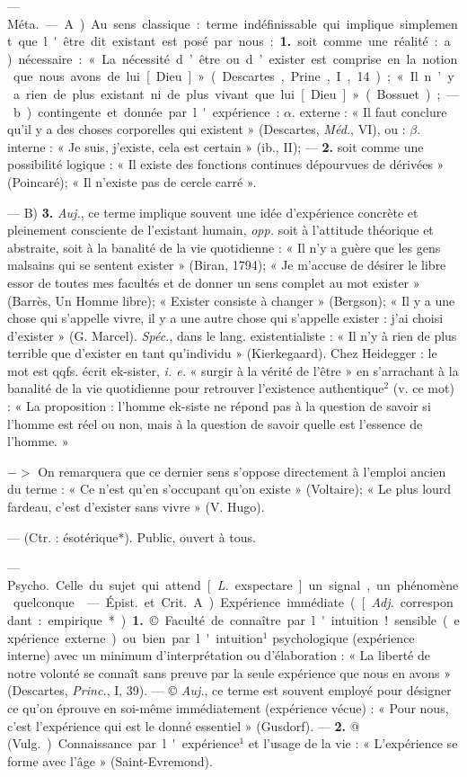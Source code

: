 \begin{itemize}[leftmargin=1cm, label=, itemsep=1pt]
 — \si{Méta.} — A) Au sens classique : terme indéfinissable qui implique simplement que l'être dit
existant est posé par nous : {\bf 1.} soit
comme une réalité : a) nécessaire :
« La nécessité d’être ou d’exister est
comprise en la notion que nous
avons de lui [Dieu] » (Descartes,
Prine., I, 14); « Il n’y a rien de plus
existant ni de plus vivant que lui
[Dieu] » (Bossuet); — b) contingente
et donnée par l'expérience : $\alpha$. externe : « Il faut conclure qu'il y a
des choses corporelles qui existent »
(Descartes, \si{{\it Méd.}}, VI), ou : $\beta$. interne : « Je suis, j'existe, cela est
certain » (ib., II); — {\bf 2.} soit comme
une possibilité logique : « Il existe
des fonctions continues dépourvues
de dérivées » (Poincaré); « Il n'existe
pas de cercle carré ».

— B) {\bf 3.} {\it Auj.}, ce terme implique
souvent une idée d’expérience concrète et pleinement consciente de
l'existant humain, {\it opp.} soit à l’attitude théorique et abstraite, soit à
la banalité de la vie quotidienne :
« Il n’y a guère que les gens malsains
qui se sentent exister » (Biran,
1794); « Je m’accuse de désirer le
libre essor de toutes mes facultés et
de donner un sens complet au mot
exister » (Barrès, Un Homme libre);
« Exister consiste à changer »
(Bergson); « Il y a une chose qui
s'appelle vivre, il y a une autre chose
qui s'appelle exister : j'ai choisi
d'exister » (G. Marcel). {\it Spéc.}, dans
le lang. existentialiste : « Il n'y à
rien de plus terrible que d’exister
en tant qu'individu » (Kierkegaard).
Chez Heidegger : le mot est qqfs.
écrit ek-sister, {\it i. e.} « surgir à la vérité
de l'être » en s’arrachant à la banalité de la vie quotidienne pour
retrouver l'existence authentique$^2$ (v.
ce mot) : « La proposition : l’homme
ek-siste ne répond pas à la question
de savoir si l'homme est réel ou non,
mais à la question de savoir quelle
est l’essence de l’homme. »

$->$ On remarquera que ce dernier sens s'oppose directement à
l'emploi ancien du terme : « Ce n’est
qu'en s'occupant qu'on existe »
(Voltaire); « Le plus lourd fardeau,
c’est d'exister sans vivre » (V. Hugo).

 — (Ctr. : ésotérique*).
Public, ouvert à tous.

 — \si{Psycho.}
Celle du sujet qui attend [{\it L.} exspectare] un signal, un phénomène quelconque.

 — \si{Épist.} et \si{Crit.} A) Expérience immédiate. ([{\it Adj.} correspondant : empirique*). {\bf 1.} © Faculté
de connaître par l'intuition! sensible (expérience externe) ou bien
par l'intuition$^1$ psychologique (expérience interne) avec un minimum
d'interprétation ou d'élaboration :
« La liberté de notre volonté se
connaît sans preuve par la seule
expérience que nous en avons »
(Descartes, {\it Princ.}, I, 39). — © {\it Auj.},
ce terme est souvent employé pour
désigner ce qu’on éprouve en soi-même immédiatement (expérience
vécue) : « Pour nous, c’est l’expérience qui est le donné essentiel »
(Gusdorf). — {\bf 2.} @ (\si{Vulg.}) Connaissance par l'expérience$^1$ et l'usage
de la vie : « L'expérience se forme
avec l’âge » (Saint-Evremond).


\end{itemize}
